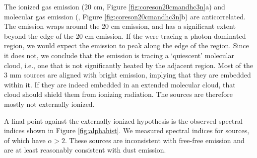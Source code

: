 \documentclass[twocolumn]{aastex61}
\begin{document}
The ionized gas emission (20 cm, Figure \ref{fig:coreson20cmandhc3n}a) and
molecular gas emission (\cyanoacetylene, Figure \ref{fig:coreson20cmandhc3n}b)
are anticorrelated.  The \cyanoacetylene emission wraps around the 20 cm
emission, and has a significant extent beyond the edge of the 20 cm emission.
If the \cyanoacetylene were tracing a photon-dominated region, we would expect
the \cyanoacetylene emission to peak along the edge of the \hii region.
Since it does not, we conclude that the \cyanoacetylene emission is tracing a
`quiescent' molecular cloud, i.e., one that is not significantly heated by
the adjacent \hii region.  Most of the 3 mm sources are aligned with bright
\cyanoacetylene emission, implying that they are embedded within it.
If they are indeed embedded in an extended molecular cloud, that cloud
should shield them from ionizing radiation.  The sources are therefore
mostly not externally ionized.

A final point against the externally ionized hypothesis is the observed
spectral indices shown in Figure \ref{fig:alphahist}.  We measured spectral
indices for \nalphas sources, of which \ngttwo have $\alpha>2$.  These \ngttwo
sources are inconsistent with free-free emission and are at least reasonably
consistent with dust emission.



% 
% 
\end{document}
